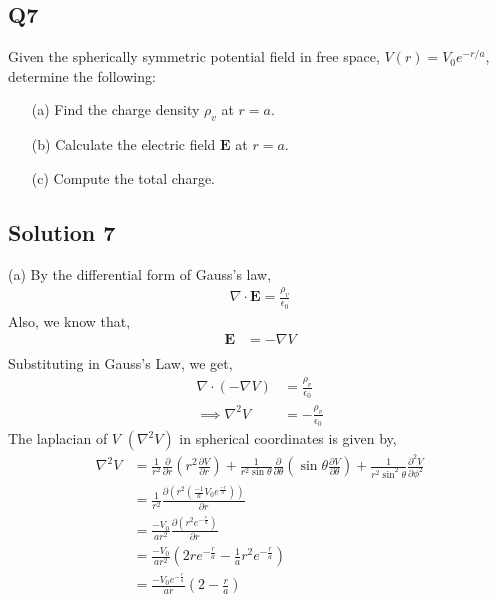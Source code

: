 \documentclass[12pt]{article}
\providecommand{\brak}[1]{\ensuremath{\left(#1\right)}}
\begin{document}
\subsection*{Q7}
Given the spherically symmetric potential field in free space, $V(r) = V_0 e^{-r/a}$, determine the following:

\begin{enumerate}
    \item[(a)] Find the charge density $\rho_v$ at $r = a$.
    \item[(b)] Calculate the electric field $\mathbf{E}$ at $r = a$.
    \item[(c)] Compute the total charge.
\end{enumerate}

\subsection*{Solution 7}
(a) By the differential form of Gauss's law,
\begin{align*}
    \nabla \cdot \mathbf{E} = \frac{\rho_v}{\epsilon_0}
\end{align*}
Also, we know that,
\begin{align*}
    \mathbf{E} &= - \nabla V\\
\end{align*}
Substituting in Gauss's Law, we get,
\begin{align}
    \nabla\cdot\brak{-\nabla V} &= \frac{\rho_v}{\epsilon_0}\\
    \implies \nabla^2 V &= -\frac{\rho_v}{\epsilon_0} \label{gauss_pot}
\end{align}
The laplacian of $V$ $\brak{\nabla^2 V}$ in spherical coordinates is given by,
\begin{align*}
    \nabla^2 V &= \frac{1}{r^2} \frac{\partial}{\partial r} \left( r^2 \frac{\partial V}{\partial r} \right) + \frac{1}{r^2 \sin \theta} \frac{\partial}{\partial \theta} \left( \sin \theta \frac{\partial V}{\partial \theta} \right) + \frac{1}{r^2 \sin^2 \theta} \frac{\partial^2 V}{\partial \phi^2}\\
    &= \frac{1}{r^2} \frac{\partial \brak{r^2 \brak{\frac{-1}{a} V_0 e^{\frac{-r}{a}}}}}{\partial r}\\
    &= \frac{-V_0}{a r^2} \frac{\partial \brak{r^2 e^{-\frac{r}{a}}}}{\partial r}\\
    &= \frac{-V_0}{a r^2} \brak{2re^{-\frac{r}{a}} - \frac{1}{a} r^2 e^{-\frac{r}{a}}}\\
    &= \frac{-V_0 e^{-\frac{r}{a}}}{ar} \brak{2 - \frac{r}{a}}
\end{align*}
\end{document}
